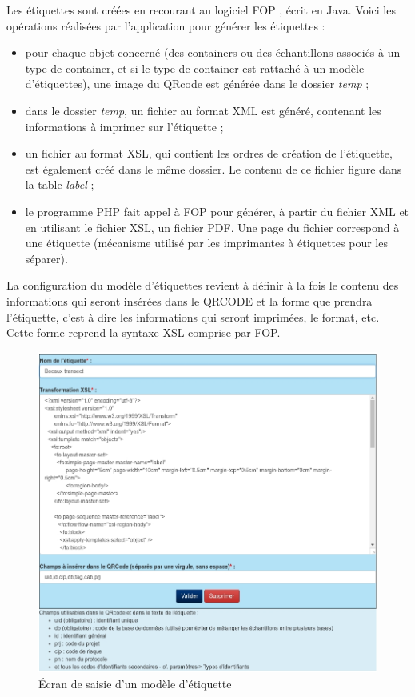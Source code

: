 Les étiquettes sont créées en recourant au logiciel FOP \cite{fop}, écrit en Java. Voici les opérations réalisées par l'application pour générer les étiquettes :
\begin{itemize}
\item pour chaque objet concerné (des containers ou des échantillons associés à un type de container, et si le type de container est rattaché à un modèle d'étiquettes), une image du QRcode est générée dans le dossier \textit{temp} ;
\item dans le dossier \textit{temp}, un fichier au format XML est généré, contenant les informations à imprimer sur l'étiquette ;
\item un fichier au format XSL, qui contient les ordres de création de l'étiquette, est également créé dans le même dossier. Le contenu de ce fichier figure dans la table \textit{label} ;
\item le programme PHP fait appel à FOP pour générer, à partir du fichier XML et en utilisant le fichier XSL, un fichier PDF. Une page du fichier correspond à une étiquette (mécanisme utilisé par les imprimantes à étiquettes pour les séparer).
\end{itemize}

La configuration du modèle d'étiquettes revient à définir à la fois le contenu des informations qui seront insérées dans le QRCODE et la forme que prendra l'étiquette, c'est à dire les informations qui seront imprimées, le format, etc. Cette forme reprend la syntaxe XSL comprise par FOP.

\begin{figure}[H]
\includegraphics[width=\linewidth]{images/label}
\caption{Écran de saisie d'un modèle d'étiquette}
\end{figure}

